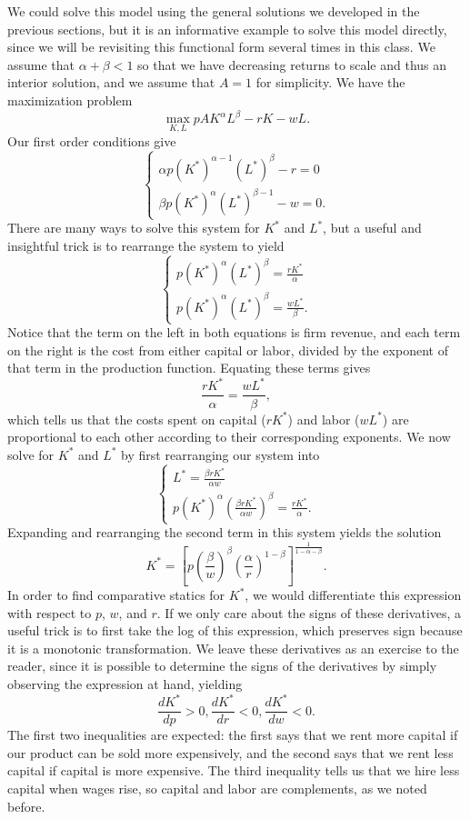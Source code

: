 We could solve this model using the general solutions we developed in the previous sections, but it is an informative example to solve this model directly, since we will be revisiting this functional form several times in this class. We assume that $\alpha + \beta < 1$ so that we have decreasing returns to scale and thus an interior solution, and we assume that $A = 1$ for simplicity. We have the maximization problem
$$\max_{K, L} pAK^\alpha L^\beta - rK - wL.$$
Our first order conditions give
$$\begin{cases}
\alpha p (K^*)^{\alpha - 1} (L^*)^{\beta} - r = 0 \\
\beta p (K^*)^{\alpha} (L^*)^{\beta - 1} - w = 0.
\end{cases}$$
There are many ways to solve this system for $K^*$ and $L^*$, but a useful and insightful trick is to rearrange the system to yield
$$\begin{cases}
p (K^*)^{\alpha} (L^*)^{\beta} = \frac{rK^*}{\alpha} \\
p (K^*)^{\alpha} (L^*)^{\beta }  = \frac{wL^*}{\beta}.
\end{cases}$$
Notice that the term on the left in both equations is firm revenue, and each term on the right is the cost from either capital or labor, divided by the exponent of that term in the production function. Equating these terms gives 
$$\frac{rK^*}{\alpha} = \frac{wL^*}{\beta},$$
which tells us that the costs spent on capital ($rK^*$) and labor ($wL^*$) are proportional to each other according to their corresponding exponents.
We now solve for $K^*$ and $L^*$ by first rearranging our system into
$$\begin{cases}
L^* = \frac{\beta r K^*}{\alpha w} \\
p (K^*)^{\alpha} (\frac{\beta r K^*}{\alpha w})^{\beta }  = \frac{rK^*}{\alpha}.
\end{cases}$$
Expanding and rearranging the second term in this system yields the solution
$$\boxed{K^* = \left[p\left(\frac{\beta}{w}\right)^{\beta} \left(\frac{\alpha}{r}\right)^{1-\beta} \right]^{\frac{1}{1-\alpha-\beta}}.}$$
In order to find comparative statics for $K^*$, we would differentiate this expression with respect to $p$, $w$, and $r$. If we only care about the signs of these derivatives, a useful trick is to first take the log of this expression, which preserves sign because it is a monotonic transformation. We leave these derivatives as an exercise to the reader, since it is possible to determine the signs of the derivatives by simply observing the expression at hand, yielding
$$\boxed{\frac{d K^*}{d p}>0, \frac{d K^*}{d r}<0, \frac{d K^*}{d w}<0.}$$
The first two inequalities are expected: the first says that we rent more capital if our product can be sold more expensively, and the second says that we rent less capital if capital is more expensive. The third inequality tells us that we hire less capital when wages rise, so capital and labor are complements, as we noted before.


